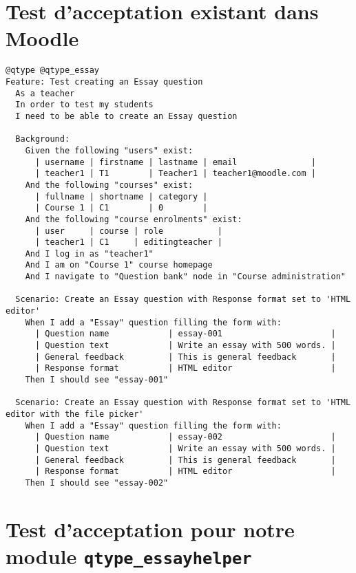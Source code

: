 \appendix
\chapter{Test d'acceptation existant dans Moodle}
\label{annexe_behat_exist}

\begin{lstlisting}[language=behat,frame=l]
@qtype @qtype_essay
Feature: Test creating an Essay question
  As a teacher
  In order to test my students
  I need to be able to create an Essay question

  Background:
    Given the following "users" exist:
      | username | firstname | lastname | email               |
      | teacher1 | T1        | Teacher1 | teacher1@moodle.com |
    And the following "courses" exist:
      | fullname | shortname | category |
      | Course 1 | C1        | 0        |
    And the following "course enrolments" exist:
      | user     | course | role           |
      | teacher1 | C1     | editingteacher |
    And I log in as "teacher1"
    And I am on "Course 1" course homepage
    And I navigate to "Question bank" node in "Course administration"

  Scenario: Create an Essay question with Response format set to 'HTML editor'
    When I add a "Essay" question filling the form with:
      | Question name            | essay-001                      |
      | Question text            | Write an essay with 500 words. |
      | General feedback         | This is general feedback       |
      | Response format          | HTML editor                    |
    Then I should see "essay-001"

  Scenario: Create an Essay question with Response format set to 'HTML editor with the file picker'
    When I add a "Essay" question filling the form with:
      | Question name            | essay-002                      |
      | Question text            | Write an essay with 500 words. |
      | General feedback         | This is general feedback       |
      | Response format          | HTML editor                    |
    Then I should see "essay-002"
\end{lstlisting}

\chapter{Test d'acceptation pour notre module \texttt{qtype\_essayhelper}}
\label{annexe_behat_new}

